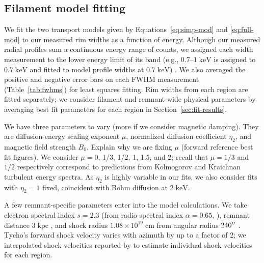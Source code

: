 \documentclass[iop, apj, numberedappendix, twocolappendix]{emulateapj}
\newcommand*{\mt}{\mathrm}
\newcommand*{\unit}[1]{\;\mt{#1}}  %
\begin{document}
\subsection{Filament model fitting}
\label{sec:fits}

We fit the two transport models given by Equations~\eqref{eq:simp-mod} and
\eqref{eq:full-mod} to our measured rim widths as a function of energy.
Although our measured radial profiles sum a continuous energy range of counts,
we assigned each width measurement to the lower energy limit of its band
(e.g., $0.7$--$1 \unit{keV}$ is assigned to $0.7 \unit{keV}$ and fitted to
model profile widths at $0.7 \unit{keV}$) .
We also averaged the positive and negative error bars on each FWHM measurement
(Table~\ref{tab:fwhms}) for least squares fitting.
Rim widths from each region are fitted separately; we consider filament and
remnant-wide physical parameters by averaging best fit parameters for each
region in Section~\ref{sec:fit-results}.

We have three parameters to vary (more if we consider magnetic damping).
They are diffusion-energy scaling exponent $\mu$, normalized diffusion
coefficient $\eta_2$, and magnetic field strength $B_0$.
Explain why we are fixing $\mu$ (forward reference best fit figures).
We consider $\mu = 0$, 1/3, 1/2, 1, 1.5, and 2; recall that $\mu = 1/3$ and $1/2$
respectively correspond to predictions from Kolmogorov and Kraichnan turbulent
energy spectra.  As $\eta_2$ is highly variable in our fits, we also consider
fits with $\eta_2 = 1$ fixed, coincident with Bohm diffusion at $2 \unit{keV}$.

A few remnant-specific parameters enter into the model calculations.  We take
electron spectral index $s = 2.3$ (from radio spectral index $\alpha = 0.65$,
\citet{kothes2006} ),
remnant distance $3 \unit{kpc}$ \citep[cf.][]{hayato2010}, and
shock radius $1.08 \times 10^{19} \unit{cm}$ from angular radius $240\mbox{$^{\prime\prime}$}$
\citep{green2009}.  Tycho's forward shock velocity varies with azimuth by up to
a factor of 2; we interpolated shock velocities reported by
\citet{williams2013} to estimate individual shock velocities for each region.
\end{document}
